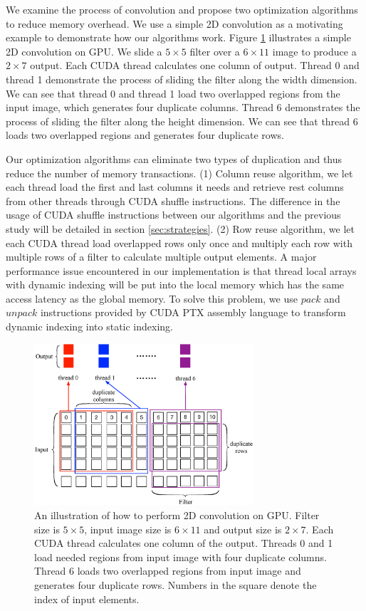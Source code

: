 We examine the process of convolution and propose two optimization algorithms to reduce memory overhead. We use a simple 2D convolution as
a motivating example to demonstrate how our algorithms work. Figure \ref{fig:twostrategies} illustrates a simple 2D convolution on GPU. We
slide a $5 \times 5$ filter over a $6 \times 11$ image to produce a $2 \times 7$ output. Each CUDA thread calculates one column of output.
Thread 0 and thread 1 demonstrate the process of sliding the filter along the width dimension. We can see that thread 0 and thread 1 load
two overlapped regions from the input image, which generates four duplicate columns. Thread 6 demonstrates the process of sliding the
filter along the height dimension. We can see that thread 6 loads two overlapped regions and generates four duplicate rows.

Our optimization algorithms can eliminate two types of duplication and thus reduce the number of memory transactions. (1) Column reuse
algorithm, we let each thread load the first and last columns it needs and retrieve rest columns from other threads through CUDA shuffle
instructions. The difference in the usage of CUDA shuffle instructions between our algorithms and the previous study
\cite{vasilache2014fast} will be detailed in section \ref{sec:strategies}. (2) Row reuse algorithm, we let each CUDA thread load overlapped
rows only once and multiply each row with multiple rows of a filter to calculate multiple output elements. A major performance issue
encountered in our implementation is that thread local arrays with dynamic indexing will be put into the local memory which has the same
access latency as the global memory. To solve this problem, we use $pack$ and $unpack$ instructions provided by CUDA PTX assembly language
to transform dynamic indexing into static indexing.

\begin{figure}
\centering
  \includegraphics[width=\columnwidth,height=6cm]{./figure/twostrategies.eps}
  \caption{An illustration of how to perform 2D convolution on GPU. Filter size is $5 \times 5$, input image size is $6 \times 11$ and output size is $2 \times 7$. Each CUDA thread calculates one column of the output. Threads 0 and 1 load needed regions from input image with four duplicate columns. Thread 6 loads two overlapped regions from input image and generates four duplicate rows. Numbers in the square denote the index of input elements.}
  \label{fig:twostrategies}
\end{figure}

